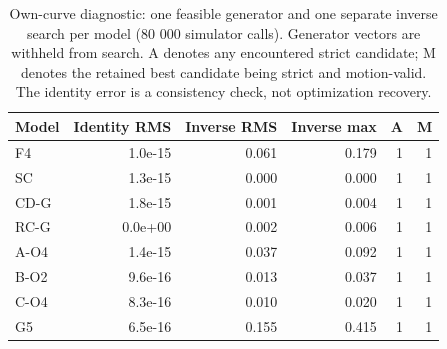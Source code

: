 \begin{table}[H]
\caption{Own-curve diagnostic: one feasible generator and one separate inverse search per model (80 000 simulator calls). Generator vectors are withheld from search. A denotes any encountered strict candidate; M denotes the retained best candidate being strict and motion-valid. The identity error is a consistency check, not optimization recovery.}
\label{tab:v2_recovery}
\centering
\small
\begin{tabular}{@{}lrrrrr@{}}
\toprule
Model & Identity RMS & Inverse RMS & Inverse max & A & M \\
\midrule
F4 & 1.0e-15 & 0.061 & 0.179 & 1 & 1 \\
SC & 1.3e-15 & 0.000 & 0.000 & 1 & 1 \\
CD-G & 1.8e-15 & 0.001 & 0.004 & 1 & 1 \\
RC-G & 0.0e+00 & 0.002 & 0.006 & 1 & 1 \\
A-O4 & 1.4e-15 & 0.037 & 0.092 & 1 & 1 \\
B-O2 & 9.6e-16 & 0.013 & 0.037 & 1 & 1 \\
C-O4 & 8.3e-16 & 0.010 & 0.020 & 1 & 1 \\
G5 & 6.5e-16 & 0.155 & 0.415 & 1 & 1 \\
\bottomrule
\end{tabular}
\end{table}
